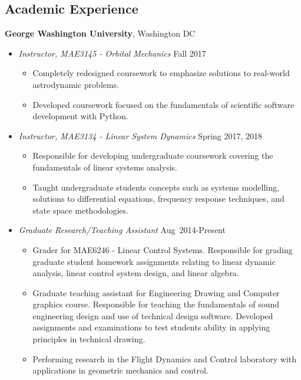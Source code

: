 \subsection*{Academic Experience}
{}

\textbf{George Washington University}, Washington DC
    \begin{itemize}
        \item[] \textit{Instructor, MAE3145 - Orbital Mechanics} \hfill {Fall 2017}
            \begin{itemize}
                \item Completely redesigned coursework to emphasize solutions to real-world astrodynamic problems.
                    
                \item Developed coursework focused on the fundamentals of scientific software development with Python.
            \end{itemize}
        \item[] \textit{Instructor, MAE3134 - Linear System Dynamics} \hfill {Spring 2017, 2018}
        \begin{itemize}
            \item Responsible for developing undergraduate coursework covering the fundamentals of linear systems analysis.
            \item Taught undergraduate students concepts such as systems modelling, solutions to differential equations, frequency response techniques, and state space methodologies. 
        \end{itemize}
        \item[] \textit{Graduate Research/Teaching Assistant} \hfill {Aug~2014-Present}
        \begin{itemize}
            \item Grader for MAE6246 - Linear Control Systems. 
            Responsible for grading graduate student homework assignments relating to linear dynamic analysis, linear control system design, and linear algebra. 
            \item Graduate teaching assistant for Engineering Drawing and Computer graphics course.
            Responsible for teaching the fundamentals of sound engineering design and use of technical design software.
            Developed assignments and examinations to test students ability in applying principles in technical drawing.
            \item Performing research in the Flight Dynamics and Control laboratory with applications in geometric mechanics and control. 

\end{itemize}
\end{itemize}

